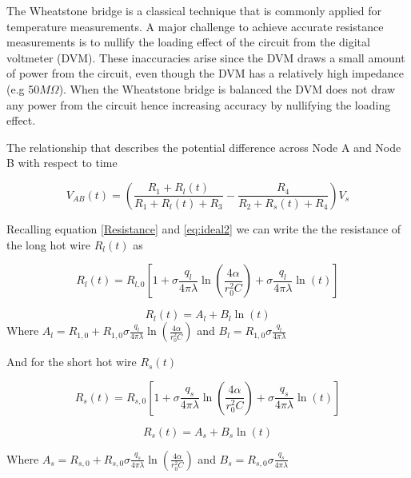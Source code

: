 \documentclass{article}
\begin{document}
The Wheatstone bridge is a classical technique that is commonly applied for temperature measurements. A major challenge to achieve accurate resistance measurements is to nullify the loading effect of the circuit from the digital voltmeter (DVM). These inaccuracies arise since the DVM draws a small amount of power from the circuit, even though the DVM has a relatively high impedance (e.g 50$M\Omega$). When the Wheatstone bridge is balanced the DVM does not draw any power from the circuit hence increasing accuracy by nullifying the loading effect. 

\vspace{3mm}

The relationship that describes the potential difference across Node A and Node B with respect to time  

	\begin{equation} \label{V_wb}
V_{AB}(t) = \left( \frac{R_1 + R_l(t)}{R_1 + R_l(t) + R_3} - \frac{R_4}{R_2 + R_s(t) + R_4} \right) V_{s}
	\end{equation}

Recalling equation \ref{Resistance} and \ref{eq:ideal2} we can write the the resistance of the long hot wire $R_l(t)$ as

$$R_l(t) = R_{l,0} \left[ 1 + \sigma \frac{q_l}{4 \pi \lambda} \ln \left( \frac{4 \alpha }		{r^2_0 C}\right) + \sigma \frac{q_l}{4 \pi \lambda} \ln \left( t \right) \right]$$

	\begin{equation} \label{eq:R_long}
	R_l(t) = A_l + B_l \ln (t)
	\end{equation}
Where $A_l = R_{1,0} + R_{1,0} \sigma \frac{q_l}{4 \pi \lambda} \ln \left( \frac{4 \alpha }		{r^2_0 C}\right)$ and $B_l = R_{1,0} \sigma \frac{q_l}{4 \pi \lambda}$


\vspace{3mm}

And for the short hot wire $R_s(t)$

$$R_s(t) = R_{s,0} \left[ 1 + \sigma \frac{q_s}{4 \pi \lambda} \ln \left( \frac{4 \alpha }		{r^2_0 C}\right) + \sigma \frac{q_s}{4 \pi \lambda} \ln \left( t \right) \right]$$
	
	\begin{equation} \label{eq:R_short}
	R_s(t) = A_s + B_s \ln (t)
	\end{equation}

Where $A_s = R_{s,0} + R_{s,0} \sigma \frac{q_s}{4 \pi \lambda} \ln \left( \frac{4 \alpha }		{r^2_0 C}\right)$ and $B_s = R_{s,0} \sigma \frac{q_s}{4 \pi \lambda}$
\end{document}
